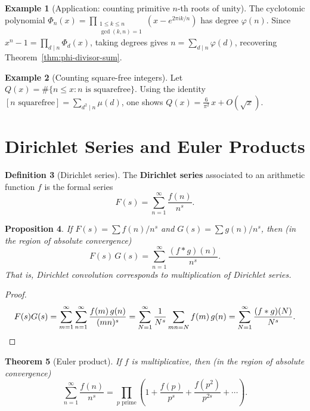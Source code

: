 \documentclass[12pt,a4paper,openany]{book}
\theoremstyle{definition}
\newtheorem{definition}{Definition}[chapter]
\newtheorem{example}[definition]{Example}
\theoremstyle{plain}
\newtheorem{theorem}[definition]{Theorem}
\newtheorem{proposition}[definition]{Proposition}
\theoremstyle{remark}
\begin{document}
\begin{example}[Application: counting primitive $n$-th roots of unity]
\label{ex:primitive-roots-unity}
The cyclotomic polynomial $\Phi_n(x) = \prod_{\substack{1\le k \le n \\
\gcd(k,n)=1}}(x - e^{2\pi i k/n})$ has degree $\varphi(n)$.  Since
$x^n - 1 = \prod_{d\mid n}\Phi_d(x)$, taking degrees gives
$n = \sum_{d\mid n}\varphi(d)$, recovering Theorem~\ref{thm:phi-divisor-sum}.
\end{example}

\begin{example}[Counting square-free integers]\label{ex:squarefree}
Let $Q(x) = \#\{n \le x : n \text{ is squarefree}\}$.  Using the identity
$[\text{$n$ squarefree}] = \sum_{d^2\mid n}\mu(d)$, one shows
$Q(x) = \frac{6}{\pi^2}\,x + O(\sqrt{x})$.
\end{example}

\section{Dirichlet Series and Euler Products}\label{sec:dirichlet-series}

\begin{definition}[Dirichlet series]\label{def:dirichlet-series}
The \textbf{Dirichlet series} associated to an arithmetic function $f$ is the
formal series
\[
  F(s) = \sum_{n=1}^{\infty} \frac{f(n)}{n^s}.
\]
\end{definition}

\begin{proposition}\label{prop:dir-series-conv}
If $F(s) = \sum f(n)/n^s$ and $G(s) = \sum g(n)/n^s$, then (in the region
of absolute convergence)
\[
  F(s)\,G(s) = \sum_{n=1}^{\infty} \frac{(f\ast g)(n)}{n^s}.
\]
That is, Dirichlet convolution corresponds to multiplication of Dirichlet series.
\end{proposition}

\begin{proof}
\[
  F(s)G(s) = \sum_{m=1}^{\infty}\sum_{n=1}^{\infty}
  \frac{f(m)\,g(n)}{(mn)^s}
  = \sum_{N=1}^{\infty}\frac{1}{N^s}\sum_{mn=N}f(m)\,g(n)
  = \sum_{N=1}^{\infty}\frac{(f\ast g)(N)}{N^s}. \qedhere
\]
\end{proof}

\begin{theorem}[Euler product]\label{thm:euler-product}
If $f$ is multiplicative, then (in the region of absolute convergence)
\[
  \sum_{n=1}^{\infty} \frac{f(n)}{n^s}
  = \prod_{p\text{ prime}} \left(1 + \frac{f(p)}{p^s}
    + \frac{f(p^2)}{p^{2s}} + \cdots\right).
\]
\end{theorem}
\end{document}
